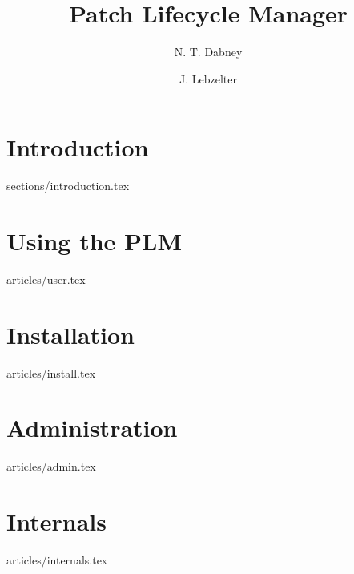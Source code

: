 \documentclass [twoside,12pt] {report}
\begin{document}
\title {Patch Lifecycle Manager}
\author {N. T. Dabney \and J. Lebzelter}

\maketitle 
\tableofcontents

\chapter{Introduction}
 {sections/introduction.tex}
\chapter{Using the PLM}
 {articles/user.tex}
\chapter{Installation}
 {articles/install.tex}
\chapter{Administration}
 {articles/admin.tex}
\chapter{Internals}
 {articles/internals.tex}

\printindex
\end{document}
